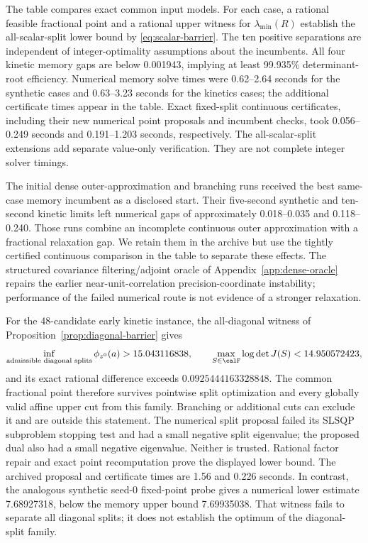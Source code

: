 The table compares exact common input models. For each case, a rational
feasible fractional point and a rational upper witness for
$\lambda_{\min}(R)$ establish the all-scalar-split lower bound by
\eqref{eq:scalar-barrier}. The ten positive separations are independent of
integer-optimality assumptions about the incumbents. All four kinetic memory
gaps are below 0.001943, implying at least 99.935\% determinant-root efficiency.
Numerical memory solve times were 0.62--2.64 seconds for the synthetic cases
and 0.63--3.23 seconds for the kinetics cases; the additional certificate times
appear in the table. Exact fixed-split continuous certificates, including their
new numerical point proposals and incumbent checks, took 0.056--0.249 seconds
and 0.191--1.203 seconds, respectively. The all-scalar-split extensions add
separate value-only verification. They are not complete integer solver timings.

The initial dense outer-approximation and branching runs received the best
same-case memory incumbent as a disclosed start. Their five-second synthetic
and ten-second kinetic limits left numerical gaps of approximately
0.018--0.035 and 0.118--0.240. Those runs combine an incomplete continuous
outer approximation with a fractional relaxation gap. We retain them in the
archive but use the tightly certified continuous comparison in the table to
separate these effects. The structured covariance filtering/adjoint oracle of
Appendix~\ref{app:dense-oracle} repairs the earlier near-unit-correlation
precision-coordinate instability; performance of the failed numerical route
is not evidence of a stronger relaxation.

For the 48-candidate early kinetic instance, the all-diagonal witness of
Proposition~\ref{prop:diagonal-barrier} gives
\begin{equation}\label{eq:kinetic-diagonal-separation}
 \inf_{\text{admissible diagonal splits}}
    \phi_{z^0}(a)>15.043116838,
 \qquad \max_{S\in\calF}\log\det J(S)<14.950572423,
\end{equation}
and its exact rational difference exceeds $0.0925444163328848$.
The common fractional point therefore survives pointwise split optimization
and every globally valid affine upper cut from this family. Branching or
additional cuts can exclude it and are outside this statement. The numerical
split proposal failed its SLSQP subproblem stopping test and had a small
negative split eigenvalue; the proposed dual also had a small negative
eigenvalue. Neither is trusted. Rational factor repair and exact point
recomputation prove the displayed lower bound. The archived proposal and
certificate times are 1.56 and 0.226 seconds. In contrast, the analogous
synthetic seed-0 fixed-point probe gives a numerical lower estimate 7.68927318,
below the memory upper bound 7.69935038. That witness fails to separate all
diagonal splits; it does not establish the optimum of the diagonal-split family.

